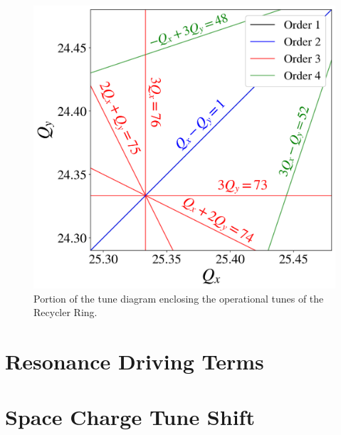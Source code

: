  \begin{figure}[H]
    \centering
    \includegraphics[width=\columnwidth]{chapter1/rrtd.png}
    \caption{Portion of the tune diagram enclosing the operational tunes of the Recycler Ring.}
    \label{fig:rrtd}
 \end{figure}

\section{Resonance Driving Terms}

\section{Space Charge Tune Shift}
